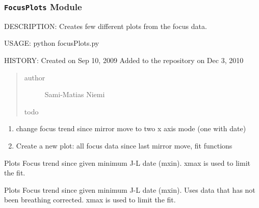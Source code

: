 \documentclass[letterpaper,10pt,english]{sphinxmanual}
\begin{document}
\subsubsection{\texttt{FocusPlots} Module}
\label{SamPy.focus:module-SamPy.focus.FocusPlots}\label{SamPy.focus:focusplots-module}
DESCRIPTION:
Creates few different plots from the focus data.

USAGE:
python focusPlots.py

HISTORY:
Created on Sep 10, 2009
Added to the repository on Dec 3, 2010
\begin{quote}\begin{description}
\item[{author}] \leavevmode
Sami-Matias Niemi

\item[{todo}] \leavevmode
\end{description}\end{quote}
\begin{enumerate}
\item {} 
change focus trend since mirror move to two x axis mode (one with date)

\item {} 
Create a new plot: all focus data since last mirror move, fit functions

\end{enumerate}


\begin{fulllineitems}
\label{SamPy.focus:SamPy.focus.FocusPlots.FocusTrend}
Plots Focus trend since given minimum J-L date (mxin).
xmax is used to limit the fit.

\end{fulllineitems}



\begin{fulllineitems}
\label{SamPy.focus:SamPy.focus.FocusPlots.FocusTrendNoBreathing}
Plots Focus trend since given minimum J-L date (mxin).
Uses data that has not been breathing corrected.
xmax is used to limit the fit.

\end{fulllineitems}
\end{document}

